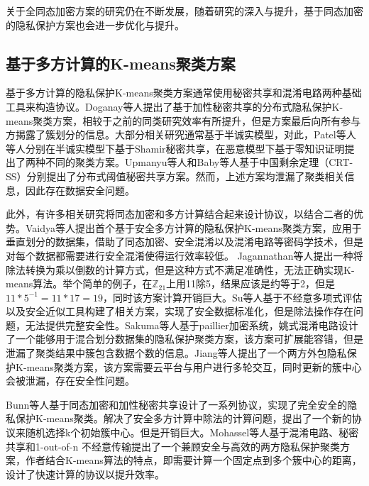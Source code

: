 关于全同态加密方案的研究仍在不断发展，随着研究的深入与提升，基于同态加密的隐私保护方案也会进一步优化与提升。

\subsection{基于多方计算的K-means聚类方案}
基于多方计算的隐私保护K-means聚类方案通常使用秘密共享和混淆电路两种基础工具来构造协议。Doganay等人\cite{doganay2008distributed}提出了基于加性秘密共享的分布式隐私保护K-means聚类方案，相较于之前的同类研究效率有所提升，但是方案最后向所有参与方揭露了簇划分的信息。大部分相关研究通常基于半诚实模型，对此，Patel等人\cite{patel2012efficient,patel2013privacy}等人分别在半诚实模型下基于Shamir秘密共享，在恶意模型下基于零知识证明提出了两种不同的聚类方案。Upmanyu等人\cite{upmanyu2010efficient}和Baby等人\cite{baby2016distributed}基于中国剩余定理（CRT-SS）分别提出了分布式阈值秘密共享方案。然而，上述方案均泄漏了聚类相关信息，因此存在数据安全问题\cite{hegde2021sok}。

此外，有许多相关研究将同态加密和多方计算结合起来设计协议，以结合二者的优势。Vaidya等人\cite{vaidya2003privacy}提出首个基于安全多方计算的隐私保护K-means聚类方案\cite{meskine2012privacy}，应用于垂直划分的数据集，借助了同态加密、安全混淆\cite{du2001privacy}以及混淆电路等密码学技术，但是对每个数据都需要进行安全混淆使得运行效率较低。
Jagannathan等人\cite{jagannathan2005privacy}提出一种将除法转换为乘以倒数的计算方式，但是这种方式不满足准确性，无法正确实现K-means算法。举个简单的例子，在$\mathbb{Z}_{21}$上用11除5，结果应该是约等于2，但是$11*5^{-1}=11*17=19$，同时该方案计算开销巨大\cite{bunn2007secure}。Su等人\cite{su2007privacy}基于不经意多项式评估以及安全近似工具构建了相关方案，实现了安全数据标准化，但是除法操作存在问题，无法提供完整安全性。Sakuma等人\cite{sakuma2010large}基于paillier加密系统，姚式混淆电路设计了一个能够用于混合划分数据集的隐私保护聚类方案，该方案可扩展能容错，但是泄漏了聚类结果中簇包含数据个数的信息。Jiang等人\cite{jiang2020efficient}提出了一个两方外包隐私保护K-means聚类方案，该方案需要云平台与用户进行多轮交互，同时更新的簇中心会被泄漏，存在安全性问题。

Bunn等人\cite{bunn2007secure}基于同态加密和加性秘密共享设计了一系列协议，实现了完全安全的隐私保护K-means聚类。解决了安全多方计算中除法的计算问题，提出了一个新的协议来随机选择k个初始簇中心。但是开销巨大。Mohassel等人\cite{mohassel2019practical}基于混淆电路、秘密共享和1-out-of-n 不经意传输提出了一个兼顾安全与高效的两方隐私保护聚类方案，作者结合K-means算法的特点，即需要计算一个固定点到多个簇中心的距离，设计了快速计算的协议以提升效率。

